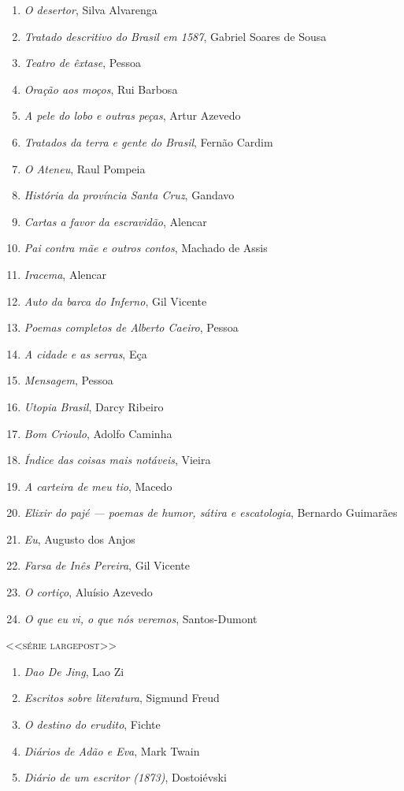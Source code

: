 \begin{enumerate}
\setlength\parskip{4.2pt}
\setlength\itemsep{-1.4mm}
\item \textit{O desertor}, Silva Alvarenga
\item \textit{Tratado descritivo do Brasil em 1587}, Gabriel Soares de Sousa
\item \textit{Teatro de êxtase}, Pessoa
\item \textit{Oração aos moços}, Rui Barbosa
\item \textit{A pele do lobo e outras peças}, Artur Azevedo
\item \textit{Tratados da terra e gente do Brasil}, Fernão Cardim 
\item \textit{O Ateneu}, Raul Pompeia
\item \textit{História da província Santa Cruz}, Gandavo
\item \textit{Cartas a favor da escravidão}, Alencar
\item \textit{Pai contra mãe e outros contos}, Machado de Assis
\item \textit{Iracema}, Alencar
\item \textit{Auto da barca do Inferno}, Gil Vicente
\item \textit{Poemas completos de Alberto Caeiro}, Pessoa
\item \textit{A cidade e as serras}, Eça
\item \textit{Mensagem}, Pessoa
\item \textit{Utopia Brasil}, Darcy Ribeiro
\item \textit{Bom Crioulo}, Adolfo Caminha
\item \textit{Índice das coisas mais notáveis}, Vieira
\item \textit{A carteira de meu tio}, Macedo
\item \textit{Elixir do pajé --- poemas de humor, sátira e escatologia}, Bernardo Guimarães
\item \textit{Eu}, Augusto dos Anjos
\item \textit{Farsa de Inês Pereira}, Gil Vicente
\item \textit{O cortiço}, Aluísio Azevedo
\item \textit{O que eu vi, o que nós veremos}, Santos-Dumont


\end{enumerate}\medskip

{\large\textsc{<<série largepost>>}}

\begin{enumerate}
\setlength\parskip{4.2pt}
\setlength\itemsep{-1.4mm}
\item \textit{Dao De Jing}, Lao Zi
\item \textit{Escritos sobre literatura}, Sigmund Freud
\item \textit{O destino do erudito}, Fichte
\item \textit{Diários de Adão e Eva}, Mark Twain
\item \textit{Diário de um escritor (1873)}, Dostoiévski
\end{enumerate}


